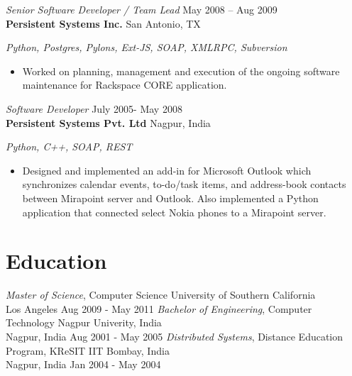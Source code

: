 \documentclass[margin,line]{resume}
\begin{document}
\begin{resume}
{\sl Senior Software Developer / Team Lead } \hfill
     May 2008 – Aug 2009\\
     \textbf{Persistent Systems Inc.} \hfill
     San Antonio, TX\\[4pt]
{\small\centering\textit{Python, Postgres, Pylons, Ext-JS, SOAP, XMLRPC, Subversion }\par}\vspace*{-\baselineskip}
\vspace{4pt}
\begin{itemize} \itemsep -2pt %
\small\item Worked on planning, management and execution of the ongoing software maintenance for Rackspace CORE application.
\end{itemize}
\vspace{-\baselineskip} %
\vspace{4pt}
{\sl Software Developer } \hfill
     July 2005- May 2008\\
     \textbf{Persistent Systems Pvt. Ltd } \hfill
     Nagpur, India\\[4pt]
{\small\centering\textit{Python, C++, SOAP, REST }\par}\vspace*{-\baselineskip}
\vspace{4pt}
\begin{itemize} \itemsep -2pt %
\small\item Designed and implemented an add-in for Microsoft Outlook which synchronizes calendar events, to-do/task items, and address-book contacts between Mirapoint server and Outlook. Also implemented a Python application that connected select Nokia phones to a Mirapoint server.
\end{itemize}
\vspace{4pt}
\section{Education}
{\small
  {\sl Master of Science}, Computer Science \hfill
  University of Southern California\\
  Los Angeles \hfill
  Aug 2009 - May 2011
}
\linebreak
{\small
  {\sl Bachelor of Engineering}, Computer Technology \hfill
  Nagpur Univerity, India\\
  Nagpur, India \hfill
  Aug 2001 - May 2005  
}
\linebreak
{\small
  {\sl Distributed Systems}, Distance Education Program, KReSIT  \hfill
  IIT Bombay, India \\
  Nagpur, India \hfill
  Jan 2004 - May 2004
}

\end{resume}
\end{document}
